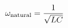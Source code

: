 \documentclass[preview]{standalone}
\begin{document}
\begin{align*}
\omega_{\text{natural}} =  {1 \over \sqrt{ L C}}
\end{align*}
\end{document}
